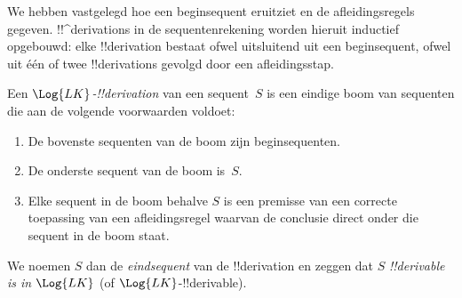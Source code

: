\documentclass[openany]{memoir}
\begin{document}
\begingroup
\def\olfilename{OLP-0074}
\def\olfilepath{content/first-order-logic/sequent-calculus/}
\hypertarget{unit-OLP-0074}{}



      {}
      {}


\begin{explain}
We hebben vastgelegd hoe een beginsequent eruitziet en de
afleidingsregels gegeven. !!^{derivation}s in de sequentenrekening
worden hieruit inductief opgebouwd: elke !!{derivation} bestaat ofwel
uitsluitend uit een beginsequent, ofwel uit één of twee
!!{derivation}s gevolgd door een afleidingsstap.
\end{explain}

\begin{defn}
Een \emph{$\Log{LK}$-!!{derivation}} van een sequent~$S$ is een eindige
boom van sequenten die aan de volgende voorwaarden voldoet:
\begin{enumerate}
\item De bovenste sequenten van de boom zijn beginsequenten.
\item De onderste sequent van de boom is~$S$.
\item Elke sequent in de boom behalve $S$ is een premisse van een
  correcte toepassing van een afleidingsregel waarvan de conclusie
  direct onder die sequent in de boom staat.
\end{enumerate}
We noemen $S$ dan de \emph{eindsequent} van de !!{derivation} en zeggen
dat $S$ \emph{!!{derivable} is in $\Log{LK}$} (of
$\Log{LK}$-!!{derivable}).
\end{defn}
\end{document}

